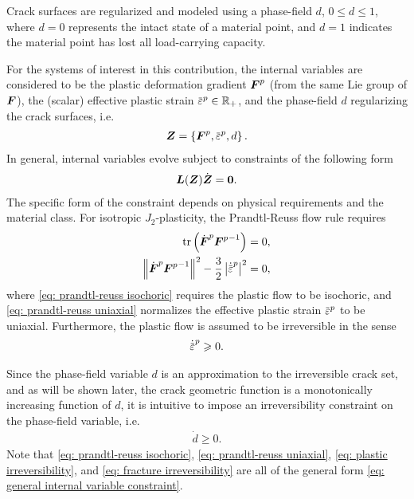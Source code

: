 Crack surfaces are regularized and modeled using a phase-field $d$, $0 \leqslant d \leqslant 1$, where $d = 0$ represents the intact state of a material point, and $d = 1$ indicates the material point has lost all load-carrying capacity.

For the systems of interest in this contribution, the internal variables are considered to be the plastic deformation gradient $\boldsymbol{F}^p$ (from the same Lie group of $\boldsymbol{F}$), the (scalar) effective plastic strain $\ep \in \mathbb{R}_+$, and the phase-field $d$ regularizing the crack surfaces, i.e.
\begin{align}
  \bfZ = \left\{ \bfF^p, \ep, d \right\}.
\end{align}
In general, internal variables evolve subject to constraints of the following form
\begin{align}
  \boldsymbol{L}(\boldsymbol{Z})\dot{\boldsymbol{Z}} = \boldsymbol{0}. \label{eq: general internal variable constraint}
\end{align}
The specific form of the constraint depends on physical requirements and the material class. For isotropic $J_2$-plasticity, the Prandtl-Reuss flow rule requires
\begin{subequations}
  \begin{align}
    \tr\left( \dot{\bfF}^p {\bfF^p}^{-1} \right)                     & = 0, \label{eq: prandtl-reuss isochoric} \\
    \norm{\dot{\bfF}^p {\bfF^p}^{-1}}^2 - \dfrac{3}{2}\abs{\epdot}^2 & = 0, \label{eq: prandtl-reuss uniaxial}  
  \end{align}
\end{subequations}
where \eqref{eq: prandtl-reuss isochoric} requires the plastic flow to be isochoric, and \eqref{eq: prandtl-reuss uniaxial} normalizes the effective plastic strain $\ep$ to be uniaxial. Furthermore, the plastic flow is assumed to be irreversible in the sense
\begin{align}
  \epdot \geqslant 0. \label{eq: plastic irreversibility}
\end{align}

Since the phase-field variable $d$ is an approximation to the irreversible crack set, and as will be shown later, the crack geometric function is a monotonically increasing function of $d$, it is intuitive to impose an irreversibility constraint on the phase-field variable, i.e.
\begin{align}
  \dot{d} \geqslant 0. \label{eq: fracture irreversibility}
\end{align}
Note that \eqref{eq: prandtl-reuss isochoric}, \eqref{eq: prandtl-reuss uniaxial}, \eqref{eq: plastic irreversibility}, and \eqref{eq: fracture irreversibility} are all of the general form \eqref{eq: general internal variable constraint}.
